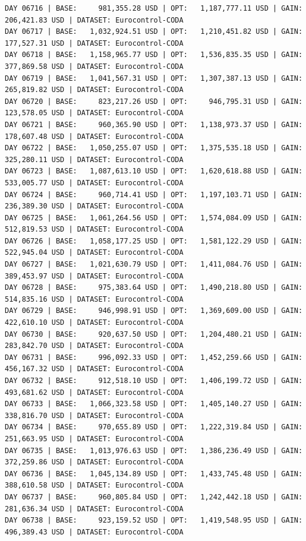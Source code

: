 \documentclass[11pt,a4paper]{article}
\begin{document}
\begin{verbatim}
DAY 06716 | BASE:     981,355.28 USD | OPT:   1,187,777.11 USD | GAIN: 206,421.83 USD | DATASET: Eurocontrol-CODA
DAY 06717 | BASE:   1,032,924.51 USD | OPT:   1,210,451.82 USD | GAIN: 177,527.31 USD | DATASET: Eurocontrol-CODA
DAY 06718 | BASE:   1,158,965.77 USD | OPT:   1,536,835.35 USD | GAIN: 377,869.58 USD | DATASET: Eurocontrol-CODA
DAY 06719 | BASE:   1,041,567.31 USD | OPT:   1,307,387.13 USD | GAIN: 265,819.82 USD | DATASET: Eurocontrol-CODA
DAY 06720 | BASE:     823,217.26 USD | OPT:     946,795.31 USD | GAIN: 123,578.05 USD | DATASET: Eurocontrol-CODA
DAY 06721 | BASE:     960,365.90 USD | OPT:   1,138,973.37 USD | GAIN: 178,607.48 USD | DATASET: Eurocontrol-CODA
DAY 06722 | BASE:   1,050,255.07 USD | OPT:   1,375,535.18 USD | GAIN: 325,280.11 USD | DATASET: Eurocontrol-CODA
DAY 06723 | BASE:   1,087,613.10 USD | OPT:   1,620,618.88 USD | GAIN: 533,005.77 USD | DATASET: Eurocontrol-CODA
DAY 06724 | BASE:     960,714.41 USD | OPT:   1,197,103.71 USD | GAIN: 236,389.30 USD | DATASET: Eurocontrol-CODA
DAY 06725 | BASE:   1,061,264.56 USD | OPT:   1,574,084.09 USD | GAIN: 512,819.53 USD | DATASET: Eurocontrol-CODA
DAY 06726 | BASE:   1,058,177.25 USD | OPT:   1,581,122.29 USD | GAIN: 522,945.04 USD | DATASET: Eurocontrol-CODA
DAY 06727 | BASE:   1,021,630.79 USD | OPT:   1,411,084.76 USD | GAIN: 389,453.97 USD | DATASET: Eurocontrol-CODA
DAY 06728 | BASE:     975,383.64 USD | OPT:   1,490,218.80 USD | GAIN: 514,835.16 USD | DATASET: Eurocontrol-CODA
DAY 06729 | BASE:     946,998.91 USD | OPT:   1,369,609.00 USD | GAIN: 422,610.10 USD | DATASET: Eurocontrol-CODA
DAY 06730 | BASE:     920,637.50 USD | OPT:   1,204,480.21 USD | GAIN: 283,842.70 USD | DATASET: Eurocontrol-CODA
DAY 06731 | BASE:     996,092.33 USD | OPT:   1,452,259.66 USD | GAIN: 456,167.32 USD | DATASET: Eurocontrol-CODA
DAY 06732 | BASE:     912,518.10 USD | OPT:   1,406,199.72 USD | GAIN: 493,681.62 USD | DATASET: Eurocontrol-CODA
DAY 06733 | BASE:   1,066,323.58 USD | OPT:   1,405,140.27 USD | GAIN: 338,816.70 USD | DATASET: Eurocontrol-CODA
DAY 06734 | BASE:     970,655.89 USD | OPT:   1,222,319.84 USD | GAIN: 251,663.95 USD | DATASET: Eurocontrol-CODA
DAY 06735 | BASE:   1,013,976.63 USD | OPT:   1,386,236.49 USD | GAIN: 372,259.86 USD | DATASET: Eurocontrol-CODA
DAY 06736 | BASE:   1,045,134.89 USD | OPT:   1,433,745.48 USD | GAIN: 388,610.58 USD | DATASET: Eurocontrol-CODA
DAY 06737 | BASE:     960,805.84 USD | OPT:   1,242,442.18 USD | GAIN: 281,636.34 USD | DATASET: Eurocontrol-CODA
DAY 06738 | BASE:     923,159.52 USD | OPT:   1,419,548.95 USD | GAIN: 496,389.43 USD | DATASET: Eurocontrol-CODA

\end{verbatim}
\end{document}
